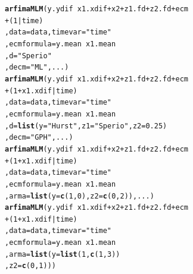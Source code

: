 \documentclass[12pt]{paper}\usepackage[]{graphicx}\usepackage[]{color}
\makeatletter
\newcommand{\hlnum}[1]{\textcolor[rgb]{0.686,0.059,0.569}{#1}}%
\newcommand{\hlstr}[1]{\textcolor[rgb]{0.192,0.494,0.8}{#1}}%
\newcommand{\hlopt}[1]{\textcolor[rgb]{0,0,0}{#1}}%
\newcommand{\hlstd}[1]{\textcolor[rgb]{0.345,0.345,0.345}{#1}}%
\newcommand{\hlkwc}[1]{\textcolor[rgb]{0.333,0.667,0.333}{#1}}%
\newcommand{\hlkwd}[1]{\textcolor[rgb]{0.737,0.353,0.396}{\textbf{#1}}}%
\newenvironment{kframe}{%
 \def\at@end@of@kframe{}%
 \ifinner\ifhmode%
  \def\at@end@of@kframe{\end{minipage}}%
  \begin{minipage}{\columnwidth}%
 \fi\fi%
 \def\FrameCommand##1{\hskip\@totalleftmargin \hskip-\fboxsep
 \colorbox{shadecolor}{##1}\hskip-\fboxsep
     \hskip-\linewidth \hskip-\@totalleftmargin \hskip\columnwidth}%
 \MakeFramed {\advance\hsize-\width
   \@totalleftmargin\z@ \linewidth\hsize
   \@setminipage}}%
 {\par\unskip\endMakeFramed%
 \at@end@of@kframe}
\newenvironment{knitrout}{}{} %
\makeatother
\begin{document}
\begin{knitrout}
\color{fgcolor}\begin{kframe}
\begin{alltt}
\hlkwd{arfimaMLM}\hlstd{(y.ydif} \hlopt{~} \hlstd{x1.xdif} \hlopt{+} \hlstd{x2} \hlopt{+} \hlstd{z1.fd} \hlopt{+} \hlstd{z2.fd} \hlopt{+} \hlstd{ecm}
          \hlopt{+} \hlstd{(}\hlnum{1}\hlopt{|}\hlstd{time)}
          \hlstd{,} \hlkwc{data}\hlstd{=data,} \hlkwc{timevar} \hlstd{=} \hlstr{"time"}
          \hlstd{,} \hlkwc{ecmformula} \hlstd{= y.mean} \hlopt{~} \hlstd{x1.mean}
          \hlstd{,} \hlkwc{d}\hlstd{=}\hlstr{"Sperio"}
          \hlstd{,} \hlkwc{decm}\hlstd{=}\hlstr{"ML"}\hlstd{, ...)}
\hlkwd{arfimaMLM}\hlstd{(y.ydif} \hlopt{~} \hlstd{x1.xdif} \hlopt{+} \hlstd{x2} \hlopt{+} \hlstd{z1.fd} \hlopt{+} \hlstd{z2.fd} \hlopt{+} \hlstd{ecm}
          \hlopt{+} \hlstd{(}\hlnum{1}\hlopt{+}\hlstd{x1.xdif}\hlopt{|}\hlstd{time)}
          \hlstd{,} \hlkwc{data}\hlstd{=data,} \hlkwc{timevar} \hlstd{=} \hlstr{"time"}
          \hlstd{,} \hlkwc{ecmformula} \hlstd{= y.mean} \hlopt{~} \hlstd{x1.mean}
          \hlstd{,} \hlkwc{d}\hlstd{=}\hlkwd{list}\hlstd{(}\hlkwc{y}\hlstd{=}\hlstr{"Hurst"}\hlstd{,} \hlkwc{z1}\hlstd{=}\hlstr{"Sperio"}\hlstd{,} \hlkwc{z2}\hlstd{=}\hlnum{0.25}\hlstd{)}
          \hlstd{,} \hlkwc{decm}\hlstd{=}\hlstr{"GPH"}\hlstd{, ...)}
\hlkwd{arfimaMLM}\hlstd{(y.ydif} \hlopt{~} \hlstd{x1.xdif} \hlopt{+} \hlstd{x2} \hlopt{+} \hlstd{z1.fd} \hlopt{+} \hlstd{z2.fd} \hlopt{+} \hlstd{ecm}
          \hlopt{+} \hlstd{(}\hlnum{1}\hlopt{+}\hlstd{x1.xdif}\hlopt{|}\hlstd{time)}
          \hlstd{,} \hlkwc{data}\hlstd{=data,} \hlkwc{timevar} \hlstd{=} \hlstr{"time"}
          \hlstd{,} \hlkwc{ecmformula} \hlstd{= y.mean} \hlopt{~} \hlstd{x1.mean}
          \hlstd{,} \hlkwc{arma} \hlstd{=} \hlkwd{list}\hlstd{(}\hlkwc{y} \hlstd{=} \hlkwd{c}\hlstd{(}\hlnum{1}\hlstd{,}\hlnum{0}\hlstd{),} \hlkwc{z2} \hlstd{=} \hlkwd{c}\hlstd{(}\hlnum{0}\hlstd{,}\hlnum{2}\hlstd{)), ...)}
\hlkwd{arfimaMLM}\hlstd{(y.ydif} \hlopt{~} \hlstd{x1.xdif} \hlopt{+} \hlstd{x2} \hlopt{+} \hlstd{z1.fd} \hlopt{+} \hlstd{z2.fd} \hlopt{+} \hlstd{ecm}
          \hlopt{+} \hlstd{(}\hlnum{1}\hlopt{+}\hlstd{x1.xdif}\hlopt{|}\hlstd{time)}
          \hlstd{,} \hlkwc{data}\hlstd{=data,} \hlkwc{timevar} \hlstd{=} \hlstr{"time"}
          \hlstd{,} \hlkwc{ecmformula} \hlstd{= y.mean} \hlopt{~} \hlstd{x1.mean}
          \hlstd{,} \hlkwc{arma} \hlstd{=} \hlkwd{list}\hlstd{(}\hlkwc{y} \hlstd{=} \hlkwd{list}\hlstd{(}\hlnum{1}\hlstd{,}\hlkwd{c}\hlstd{(}\hlnum{1}\hlstd{,}\hlnum{3}\hlstd{))}
                        \hlstd{,} \hlkwc{z2} \hlstd{=} \hlkwd{c}\hlstd{(}\hlnum{0}\hlstd{,}\hlnum{1}\hlstd{)))}
\end{alltt}
\end{kframe}
\end{knitrout}
\end{document}
